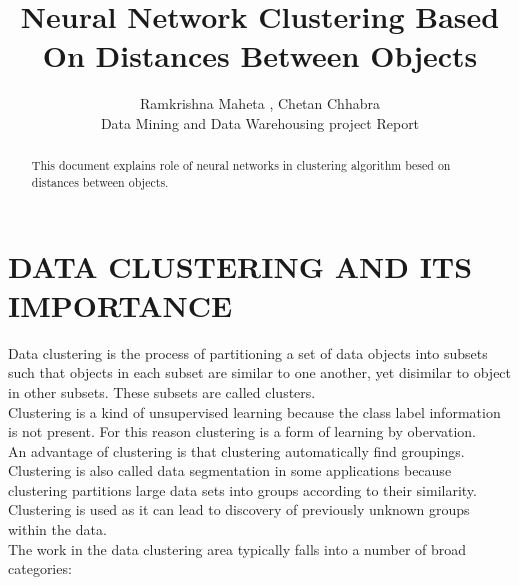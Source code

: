 \documentclass[letterpaper, 10 pt, conference]{ieeeconf}  %
\title{\LARGE \bf
Neural Network Clustering Based On Distances Between Objects
}
\author{Ramkrishna Maheta , Chetan Chhabra\\
Data Mining and Data Warehousing project Report%
}
\begin{document}
\maketitle
\thispagestyle{empty}
\pagestyle{empty}


\begin{abstract}

This document explains role of neural networks in clustering algorithm besed on distances between objects. 
\end{abstract}


\section{DATA CLUSTERING AND ITS IMPORTANCE}
Data clustering is the process of partitioning a set of data objects into subsets such that objects in each subset are similar to one another, yet disimilar to object in other subsets. These subsets are called clusters.\\
Clustering is a kind of unsupervised learning because the class label information is not present. For this reason clustering is a form of learning by obervation.\\
An advantage of clustering is that clustering automatically find groupings.\\
Clustering is also called data segmentation in some applications because clustering partitions large data sets into groups according to their similarity. Clustering is used as it can lead to discovery of previously unknown groups within the data.\\
The work in the data clustering area typically falls into a number of broad categories:
\end{document}
